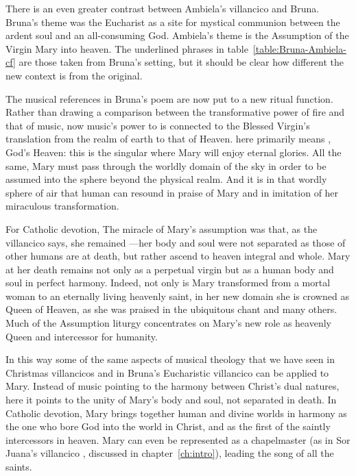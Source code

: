 There is an even greater contrast between Ambiela's villancico and Bruna.
Bruna's theme was the Eucharist as a site for mystical communion between the ardent soul and an all-consuming God.
Ambiela's theme is the Assumption of the Virgin Mary into heaven.
The underlined phrases in table~\ref{table:Bruna-Ambiela-cf} are those taken from Bruna's setting, but it should be clear how different the new context is from the original.

% 	

The musical references in Bruna's poem are now put to a new ritual function.
Rather than drawing a comparison between the transformative power of fire and that of music, now music's power to  is connected to the Blessed Virgin's translation from the realm of earth to that of Heaven.
 here primarily means , God's Heaven: this is the singular  where Mary will enjoy eternal glories.
All the same, Mary must pass through the worldly domain of the sky in order to be assumed into the sphere beyond the physical realm.
And it is in that wordly sphere of air that human  can resound in praise of Mary and in imitation of her miraculous transformation.

For Catholic devotion, The miracle of Mary's assumption was that, as the villancico says, she remained ---her body and soul were not separated as those of other humans are at death, but rather ascend to heaven integral and whole.
Mary at her death remains  not only as a perpetual virgin but as a human body and soul in perfect harmony.
Indeed, not only is Mary transformed from a mortal woman to an eternally living heavenly saint, in her new domain she is crowned as Queen of Heaven, as she was praised in the ubiquitous  chant and many others.
Much of the Assumption liturgy concentrates on Mary's new role as heavenly Queen and intercessor for humanity.

In this way some of the same aspects of musical theology that we have seen in Christmas villancicos and in Bruna's Eucharistic villancico can be applied to Mary.
Instead of music pointing to the harmony between Christ's dual natures, here it points to the unity of Mary's body and soul, not separated in death.
In Catholic devotion, Mary brings together human and divine worlds in harmony as the one who bore God into the world in Christ, and as the first of the saintly intercessors in heaven.
Mary can even be represented as a chapelmaster (as in Sor Juana's villancico , discussed in chapter~\ref{ch:intro}), leading the song of all the saints.

